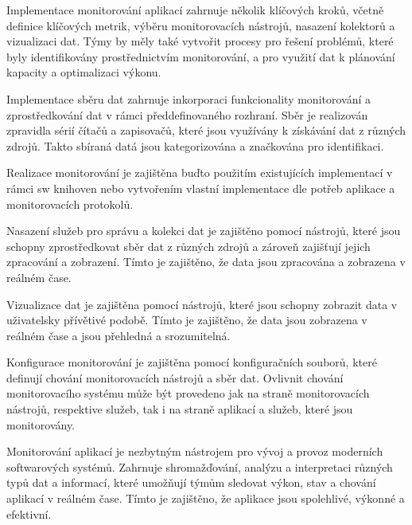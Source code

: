 
Implementace monitorování aplikací zahrnuje několik klíčových kroků, včetně definice klíčových metrik, výběru monitorovacích nástrojů, nasazení kolektorů a vizualizaci dat. Týmy by měly také vytvořit procesy pro řešení problémů, které byly identifikovány prostřednictvím monitorování, a pro využití dat k plánování kapacity a optimalizaci výkonu.


Implementace sběru dat zahrnuje inkorporaci funkcionality monitorování a zprostředkování dat v rámci předdefinovaného rozhraní. Sběr je realizován zpravidla sérií čítačů a zapisovačů, které jsou využívány k získávání dat z různých zdrojů. Takto sbíraná datá jsou kategorizována a značkována pro identifikaci.

Realizace monitorování je zajištěna buďto použitím existujících implementací v rámci sw knihoven nebo vytvořením vlastní implementace dle potřeb aplikace a monitorovacích protokolů.


Nasazení služeb pro správu a kolekci dat je zajištěno pomocí nástrojů, které jsou schopny zprostředkovat sběr dat z různých zdrojů a zároveň zajišťují jejich zpracování a zobrazení. Tímto je zajištěno, že data jsou zpracována a zobrazena v reálném čase.


Vizualizace dat je zajištěna pomocí nástrojů, které jsou schopny zobrazit data v uživatelsky přívětivé podobě. Tímto je zajištěno, že data jsou zobrazena v reálném čase a jsou přehledná a srozumitelná.


Konfigurace monitorování je zajištěna pomocí konfiguračních souborů, které definují chování monitorovacích nástrojů a sběr dat. Ovlivnit chování monitorovacího systému může být provedeno jak na straně monitorovacích nástrojů, respektive služeb, tak i na straně aplikací a služeb, které jsou monitorovány.


Monitorování aplikací je nezbytným nástrojem pro vývoj a provoz moderních softwarových systémů. Zahrnuje shromažďování, analýzu a interpretaci různých typů dat a informací, které umožňují týmům sledovat výkon, stav a chování aplikací v reálném čase. Tímto je zajištěno, že aplikace jsou spolehlivé, výkonné a efektivní.

